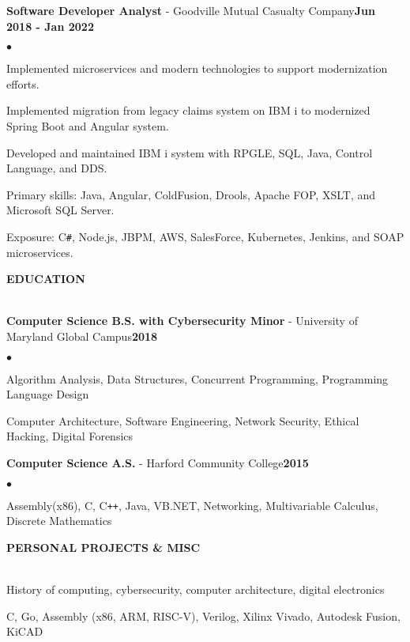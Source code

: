 \documentclass[a4paper]{article}
\newcommand{\resumeheader}[1]{
    \vspace*{8pt}
    \textbf{#1}\vspace*{-6pt}\vspace*{-4pt}\\ \hrulefill\\
    \vspace*{8pt}
}
\newcommand{\history}[3]{
    \textbf{#1} - #2\hfill\textbf{#3}
}
\newcommand{\interests}[2]{
    \textbf{\makebox[62pt][l]{#1}} #2\\\vspace*{6pt}
}
\newenvironment{resumelist}{
    \vspace*{4pt}
    \begin{list}
        {\small$\bullet$}{\topsep 0pt \itemsep -2pt \leftmargin=22pt}}{\vspace*{4pt}
    \end{list}
}
\begin{document}
        \history{Software Developer Analyst}{Goodville Mutual Casualty Company}{Jun 2018 - Jan 2022}
            \begin{resumelist}
                \item Implemented microservices and modern technologies to support modernization efforts.
                \item Implemented migration from legacy claims system on IBM i to modernized Spring Boot and Angular system.
                \item Developed and maintained IBM i system with RPGLE, SQL, Java, Control Language, and DDS.
                \item Primary skills: Java, Angular, ColdFusion, Drools, Apache FOP, XSLT, and Microsoft SQL Server.
                \item Exposure: C\texttt{\#}, Node.js, JBPM, AWS, SalesForce, Kubernetes, Jenkins, and SOAP microservices.
            \end{resumelist}

    \resumeheader{EDUCATION}

        \history{Computer Science B.S. with Cybersecurity Minor}{University of Maryland Global Campus}{2018}
            \begin{resumelist}
                \item Algorithm Analysis, Data Structures, Concurrent Programming, Programming Language Design
                \item Computer Architecture, Software Engineering, Network Security, Ethical Hacking, Digital Forensics
            \end{resumelist}
        \vspace*{6pt}

        \history{Computer Science A.S.}{Harford Community College}{2015}
            \begin{resumelist}
                \item Assembly(x86), C, C\texttt{++}, Java, VB.NET, Networking, Multivariable Calculus, Discrete Mathematics
            \end{resumelist}
    
    \resumeheader{PERSONAL PROJECTS \& MISC}
        
        \interests{Interests:}{History of computing, cybersecurity, computer architecture, digital electronics}
        \interests{Self-Taught:}{C, Go, Assembly (x86, ARM, RISC-V), Verilog, Xilinx Vivado, Autodesk Fusion, KiCAD}
        \vspace*{12pt}
\end{document}
